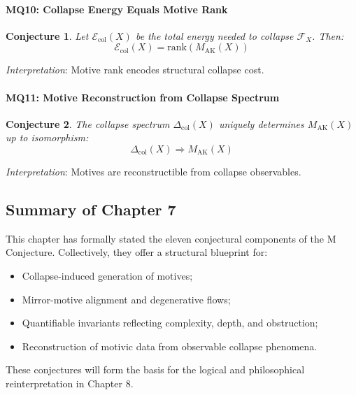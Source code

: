 \documentclass[11pt]{article}
\newtheorem{conjecture}{Conjecture}[section]
\begin{document}
\bigskip

\paragraph{MQ10: Collapse Energy Equals Motive Rank}
\begin{conjecture}
Let $\mathcal{E}_{\mathrm{col}}(X)$ be the total energy needed to collapse $\mathcal{F}_X$. Then:
\[
\mathcal{E}_{\mathrm{col}}(X) = \mathrm{rank}(M_{\mathrm{AK}}(X))
\]
\end{conjecture}
\textit{Interpretation}: Motive rank encodes structural collapse cost.

\bigskip

\paragraph{MQ11: Motive Reconstruction from Collapse Spectrum}
\begin{conjecture}
The collapse spectrum $\Delta_{\mathrm{col}}(X)$ uniquely determines $M_{\mathrm{AK}}(X)$ up to isomorphism:
\[
\Delta_{\mathrm{col}}(X) \Rightarrow M_{\mathrm{AK}}(X)
\]
\end{conjecture}
\textit{Interpretation}: Motives are reconstructible from collapse observables.

\bigskip

\subsection*{Summary of Chapter 7}

This chapter has formally stated the eleven conjectural components of the M Conjecture. Collectively, they offer a structural blueprint for:

\begin{itemize}
    \item Collapse-induced generation of motives;
    \item Mirror-motive alignment and degenerative flows;
    \item Quantifiable invariants reflecting complexity, depth, and obstruction;
    \item Reconstruction of motivic data from observable collapse phenomena.
\end{itemize}

These conjectures will form the basis for the logical and philosophical reinterpretation in Chapter 8.

\FloatBarrier
\end{document}

